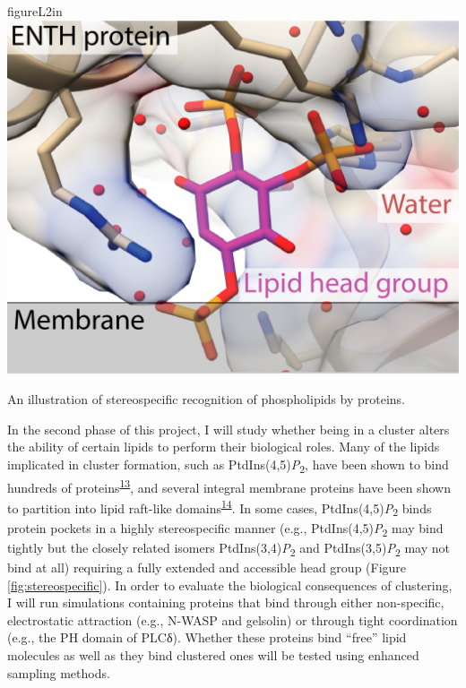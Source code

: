 \documentclass[11pt,notitlepage]{article}
\begin{document}
\begin{wrapfloat}{figure}{L}{2in}
\centering
\includegraphics{content/images/stereospecific.png}
\caption{An illustration of stereospecific recognition of phospholipids
by proteins.}
\label{fig:stereospecific}
\end{wrapfloat}

In the second phase of this project, I will study whether being in a
cluster alters the ability of certain lipids to perform their biological
roles. Many of the lipids implicated in cluster formation, such as
PtdIns(4,5)\emph{P}\textsubscript{2}, have been shown to bind hundreds
of proteins\textsuperscript{\protect\hyperlink{ref-uyKE7bWV}{13}}, and
several integral membrane proteins have been shown to partition into
lipid raft-like
domains\textsuperscript{\protect\hyperlink{ref-2TfZ4zWV}{14}}. In some
cases, PtdIns(4,5)\emph{P}\textsubscript{2} binds protein pockets in a
highly stereospecific manner (e.g., PtdIns(4,5)\emph{P}\textsubscript{2}
may bind tightly but the closely related isomers
PtdIns(3,4)\emph{P}\textsubscript{2} and
PtdIns(3,5)\emph{P}\textsubscript{2} may not bind at all) requiring a
fully extended and accessible head group (Figure
\ref{fig:stereospecific}). In order to evaluate the biological
consequences of clustering, I will run simulations containing proteins
that bind through either non-specific, electrostatic attraction (e.g.,
N-WASP and gelsolin) or through tight coordination (e.g., the PH domain
of PLCδ). Whether these proteins bind ``free'' lipid molecules as well
as they bind clustered ones will be tested using enhanced sampling
methods.
\end{document}
